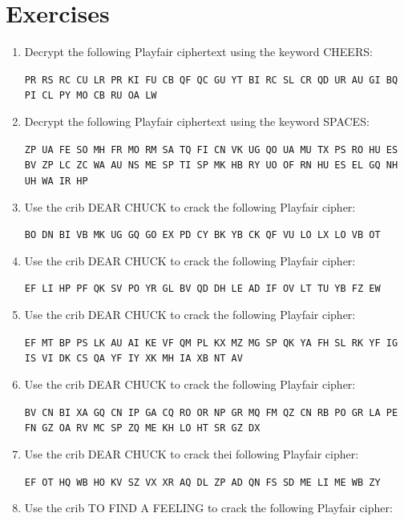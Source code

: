 \documentclass{book}
\theoremstyle{plain}
\theoremstyle{definition}
\newif\ifprintsolutions
\newcommand{\solution}[1]{\ifprintsolutions \begin{sloppypar}{\it #1}\end{sloppypar} \fi} %
\newcommand{\display}[1]{\begin{sloppypar}\setlength{\parindent}{0mm}#1\end{sloppypar}} %
\newcommand{\ciphertextspace}[1]{\begin{sloppypar}\doublespacing\Large\texttt{#1}\end{sloppypar}} %
\begin{document}
\section{Exercises}
\begin{enumerate}
\item Decrypt the following Playfair ciphertext using the keyword CHEERS: \display{\ciphertextspace{PR RS RC CU LR PR KI FU CB QF QC GU YT BI RC SL CR QD UR AU GI BQ PI CL PY MO CB RU OA LW}} \solution{There's something that doesn't make sense. Let's go and poke it with a stick.}
\item Decrypt the following Playfair ciphertext using the keyword SPACES: \display{\ciphertextspace{ZP UA FE SO MH FR MO RM SA TQ FI CN VK UG QO UA MU TX PS RO HU ES BV ZP LC ZC WA AU NS ME SP TI SP MK HB RY UO OF RN HU ES EL GQ NH UH WA IR HP}} \solution{We're having a little problem with our entry sequence, so we may experience some slight turbulence and then explode.}
\item Use the crib DEAR CHUCK to crack the following Playfair cipher:
\display{\ciphertextspace{BO DN BI VB MK UG GQ GO EX PD CY BK YB CK QF VU LO LX LO VB OT}} \solution{Keyword YELLOW: dear chuck i think your bald head is cute love lucy}
\item Use the crib DEAR CHUCK to crack the following Playfair cipher:
\display{\ciphertextspace{EF LI HP PF QK SV PO YR GL BV QD DH LE AD IF OV LT TU YB FZ EW}} \solution{Keyword TRIAL: dear chuck do you want to kick a field goal love lucy}
\item Use the crib DEAR CHUCK to crack the following Playfair cipher:
\display{\ciphertextspace{EF MT BP PS LK AU AI KE VF QM PL KX MZ MG SP QK YA FH SL RK YF IG IS VI DK CS QA YF IY XK MH IA XB NT AV}} \solution{Keyword COMMAS: dear chuck i stole my brothers security blanket and now he is a total wreck love lucy}
\item Use the crib DEAR CHUCK to crack the following Playfair cipher:
\display{\ciphertextspace{BV CN BI XA GQ CN IP GA CQ RO OR NP GR MQ FM QZ CN RB PO GR LA PE FN GZ OA RV MC SP ZQ ME KH LO HT SR GZ DX}} \solution{Keyword NERVES: dear chuck marci and peppermint patty are coming for a slumber party tonight love lucy}
\item Use the crib DEAR CHUCK to crack thei following Playfair cipher:
\display{\ciphertextspace{EF OT HQ WB HO KV SZ VX XR AQ DL ZP AD QN FS SD ME LI ME WB ZY}} \solution{Keyword VIOLA: dear chuck i got your kite out of the tree love lucy}
\item Use the crib TO FIND A FEELING to crack the following Playfair cipher:

\end{enumerate}
\end{document}
